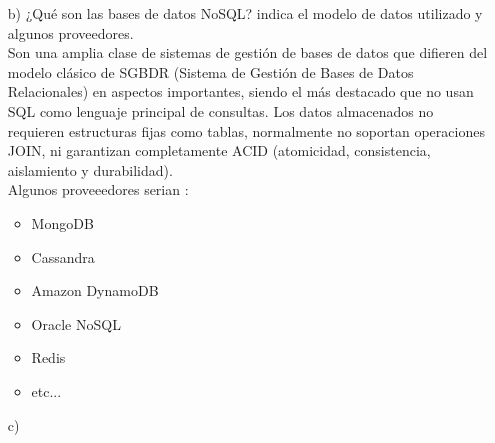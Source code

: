 \documentclass[a4paper, 12pt]{report}
\begin{document}
\begin{enumerate}
{\begin{enumerate}
{    datos es esencial en la resolución de entidades, ya que aumenta la
    fiabilidad de las entidades resueltas y las relaciones
    detectadas.Muchos problemas que se suelen presentar en una base
    de datos se pueden solucionar con una buena calidad y manejo
    de datos. Además esto reduce costos a la larga.
}
    \item[b)]{¿Qué son las bases de datos NoSQL? indica el modelo de datos utilizado y algunos proveedores. }\\
    Son una amplia clase de sistemas de gestión de bases de datos que difieren del modelo clásico de SGBDR (Sistema de Gestión de Bases de Datos Relacionales) en aspectos importantes, siendo el más destacado que no usan SQL como lenguaje principal de consultas. Los datos almacenados no requieren estructuras fijas como tablas, normalmente no soportan operaciones JOIN, ni garantizan completamente ACID (atomicidad, consistencia, aislamiento y durabilidad).\\
    Algunos proveeedores serian :
    \begin{itemize}
    	\item MongoDB
    	\item Cassandra
    	\item Amazon DynamoDB
    	\item Oracle NoSQL
    	\item Redis
    	\item etc...
    \end{itemize}
   
    \item[c)]{}
\end{enumerate}
}
\end{enumerate}
\end{document}
